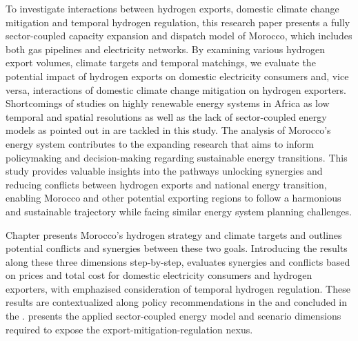 To investigate interactions between hydrogen exports, domestic climate change mitigation and temporal hydrogen regulation, this research paper presents a fully sector-coupled capacity expansion and dispatch model of Morocco, which includes both gas pipelines and electricity networks. By examining various hydrogen export volumes, climate targets and temporal matchings, we evaluate the potential impact of hydrogen exports on domestic electricity consumers and, vice versa, interactions of domestic climate change mitigation on hydrogen exporters.
Shortcomings of studies on highly renewable energy systems in Africa as low temporal and spatial resolutions as well as the lack of sector-coupled energy models as pointed out in \cite{Oyewo2023} are tackled in this study. The analysis of Morocco's energy system contributes to the expanding research that aims to inform policymaking and decision-making regarding sustainable energy transitions. This study provides valuable insights into the pathways unlocking synergies and reducing conflicts between hydrogen exports and national energy transition, enabling Morocco and other potential exporting regions to follow a harmonious and sustainable trajectory while facing similar energy system planning challenges.

Chapter  presents Morocco's hydrogen strategy and climate targets and outlines potential conflicts and synergies between these two goals. Introducing the results along these three dimensions step-by-step,  evaluates synergies and conflicts based on prices and total cost for domestic electricity consumers and hydrogen exporters, with emphazised consideration of temporal hydrogen regulation. These results are contextualized along policy recommendations in the  and concluded in the .  presents the applied sector-coupled energy model and scenario dimensions required to expose the export-mitigation-regulation nexus.



%

